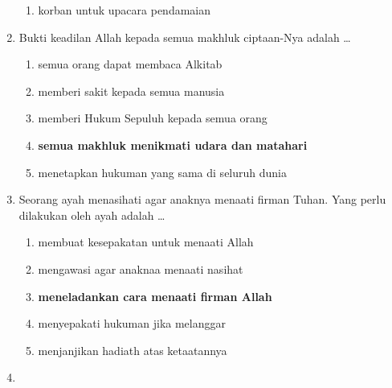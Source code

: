 \documentclass[12pt]{article}
\begin{document}
\begin{enumerate}
\begin{enumerate}
                \item korban untuk upacara pendamaian
            \end{enumerate}
        \item Bukti keadilan Allah kepada semua makhluk ciptaan-Nya adalah \dots
            \begin{enumerate}
                \item semua orang dapat membaca Alkitab
                \item memberi sakit kepada semua manusia
                \item memberi Hukum Sepuluh kepada semua orang
                \item \textbf{semua makhluk menikmati udara dan matahari}
                \item menetapkan hukuman yang sama di seluruh dunia
            \end{enumerate}
        \item Seorang ayah menasihati agar anaknya menaati firman Tuhan. Yang perlu
            dilakukan oleh ayah adalah \dots
            \begin{enumerate}
                \item membuat kesepakatan untuk menaati Allah
                \item mengawasi agar anaknaa menaati nasihat
                \item \textbf{meneladankan cara menaati firman Allah}
                \item menyepakati hukuman jika melanggar
                \item menjanjikan hadiath atas ketaatannya
            \end{enumerate}
        \item 
    \end{enumerate}
\end{document}
